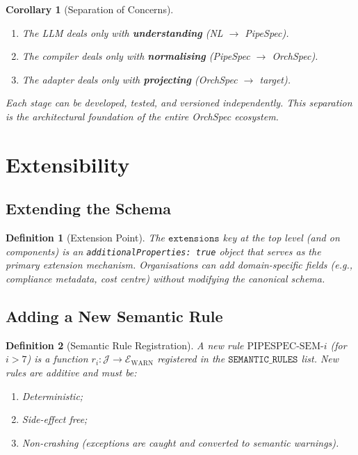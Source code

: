 \documentclass[11pt,a4paper]{article}
\newtheorem{definition}{Definition}[section]
\newtheorem{corollary}{Corollary}[section]
\theoremstyle{definition}
\newcommand{\jspace}{\mathcal{J}}
\newcommand{\warns}{\mathcal{E}_{\text{WARN}}}
\begin{document}
\begin{corollary}[Separation of Concerns]
\begin{enumerate}[label=(\roman*),leftmargin=*]
    \item The LLM deals only with \textbf{understanding} (NL $\to$ PipeSpec).
    \item The compiler deals only with \textbf{normalising} (PipeSpec $\to$ OrchSpec).
    \item The adapter deals only with \textbf{projecting} (OrchSpec $\to$ target).
\end{enumerate}
Each stage can be developed, tested, and versioned independently. This separation is the architectural foundation of the entire OrchSpec ecosystem.
\end{corollary}

\section{Extensibility}

\subsection{Extending the Schema}
\begin{definition}[Extension Point]
The $\texttt{extensions}$ key at the top level (and on components) is an \texttt{additionalProperties: true} object that serves as the primary extension mechanism. Organisations can add domain-specific fields (e.g., compliance metadata, cost centre) without modifying the canonical schema.
\end{definition}

\subsection{Adding a New Semantic Rule}
\begin{definition}[Semantic Rule Registration]
A new rule $\text{PIPESPEC-SEM-}i$ (for $i > 7$) is a function $r_i : \jspace \to \warns$ registered in the $\texttt{SEMANTIC\_RULES}$ list. New rules are additive and must be:
\begin{enumerate}[label=(\alph*),leftmargin=*]
    \item Deterministic;
    \item Side-effect free;
    \item Non-crashing (exceptions are caught and converted to semantic warnings).
\end{enumerate}
\end{definition}
\end{document}
